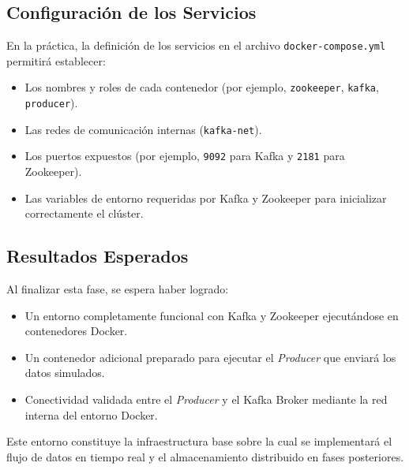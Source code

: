 \documentclass[12pt,a4paper]{article}
\begin{document}
\subsection{Configuración de los Servicios}
En la práctica, la definición de los servicios en el archivo \texttt{docker-compose.yml} permitirá establecer:
\begin{itemize}
    \item Los nombres y roles de cada contenedor (por ejemplo, \texttt{zookeeper}, \texttt{kafka}, \texttt{producer}).
    \item Las redes de comunicación internas (\texttt{kafka-net}).
    \item Los puertos expuestos (por ejemplo, \texttt{9092} para Kafka y \texttt{2181} para Zookeeper).
    \item Las variables de entorno requeridas por Kafka y Zookeeper para inicializar correctamente el clúster.
\end{itemize}

\subsection{Resultados Esperados}
Al finalizar esta fase, se espera haber logrado:
\begin{itemize}
    \item Un entorno completamente funcional con Kafka y Zookeeper ejecutándose en contenedores Docker.
    \item Un contenedor adicional preparado para ejecutar el \textit{Producer} que enviará los datos simulados.
    \item Conectividad validada entre el \textit{Producer} y el Kafka Broker mediante la red interna del entorno Docker.
\end{itemize}

Este entorno constituye la infraestructura base sobre la cual se implementará el flujo de datos en tiempo real y el almacenamiento distribuido en fases posteriores.
\end{document}
